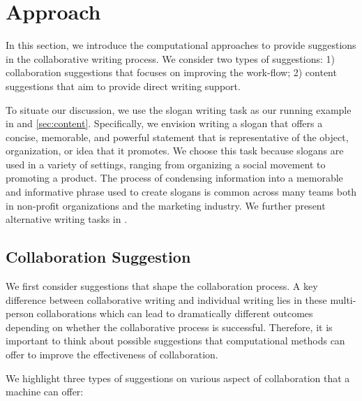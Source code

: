 
\section{Approach}


In this section, we introduce the computational approaches to provide suggestions in the collaborative writing process.
We consider two types of suggestions: 1) collaboration suggestions that focuses on improving the work-flow;
2) content suggestions that aim to provide direct writing support.

To situate our discussion, we use the slogan writing task as our running example in  and \ref{sec:content}.
Specifically, we envision writing a slogan that offers a concise, memorable,
and powerful statement that is representative of the object,
organization, or idea that it promotes.
We choose this task because slogans are used in a variety of settings, ranging
from organizing a social movement to promoting a product.
The process of condensing information into a memorable and
informative phrase used to create slogans is common across many teams both in non-profit organizations and the marketing industry.
We further present alternative writing tasks in .


\subsection{Collaboration Suggestion}
\label{sec:workflow}

We first consider suggestions that shape the collaboration process.
A key difference between collaborative writing and individual writing lies in these multi-person collaborations which can lead to dramatically different outcomes
depending on whether the collaborative process is successful.
Therefore, it is important to think about possible suggestions that computational methods can offer to improve the effectiveness of collaboration.

We highlight three types of suggestions on various aspect of collaboration that a machine can offer:

